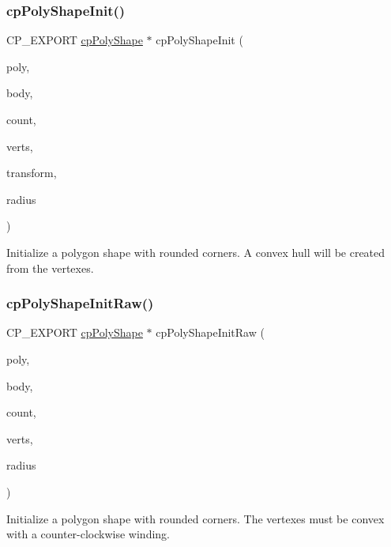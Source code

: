 \subsubsection{\texorpdfstring{cp\+Poly\+Shape\+Init()}{cpPolyShapeInit()}}
{\footnotesize\ttfamily C\+P\+\_\+\+E\+X\+P\+O\+RT \hyperlink{structcpPolyShape}{cp\+Poly\+Shape} $\ast$ cp\+Poly\+Shape\+Init (\begin{DoxyParamCaption}\item[{\hyperlink{structcpPolyShape}{cp\+Poly\+Shape} $\ast$}]{poly,  }\item[{\hyperlink{structcpBody}{cp\+Body} $\ast$}]{body,  }\item[{int}]{count,  }\item[{const \hyperlink{structcpVect}{cp\+Vect} $\ast$}]{verts,  }\item[{\hyperlink{structcpTransform}{cp\+Transform}}]{transform,  }\item[{cp\+Float}]{radius }\end{DoxyParamCaption})}

Initialize a polygon shape with rounded corners. A convex hull will be created from the vertexes. \mbox{\label{group__cpPolyShape_ga9f76eb48b88f99b70639abbec33fb73a}} 
\subsubsection{\texorpdfstring{cp\+Poly\+Shape\+Init\+Raw()}{cpPolyShapeInitRaw()}}
{\footnotesize\ttfamily C\+P\+\_\+\+E\+X\+P\+O\+RT \hyperlink{structcpPolyShape}{cp\+Poly\+Shape} $\ast$ cp\+Poly\+Shape\+Init\+Raw (\begin{DoxyParamCaption}\item[{\hyperlink{structcpPolyShape}{cp\+Poly\+Shape} $\ast$}]{poly,  }\item[{\hyperlink{structcpBody}{cp\+Body} $\ast$}]{body,  }\item[{int}]{count,  }\item[{const \hyperlink{structcpVect}{cp\+Vect} $\ast$}]{verts,  }\item[{cp\+Float}]{radius }\end{DoxyParamCaption})}

Initialize a polygon shape with rounded corners. The vertexes must be convex with a counter-\/clockwise winding. \mbox{\label{group__cpPolyShape_gaed41237141b0ef9066117a829bfce9e0}} 
